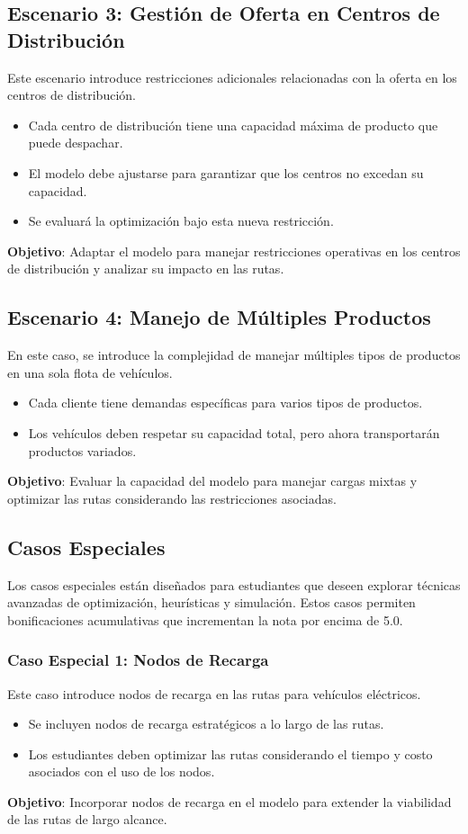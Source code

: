 \documentclass[12pt]{article}
\begin{document}
\subsection{Escenario 3: Gestión de Oferta en Centros de Distribución}
Este escenario introduce restricciones adicionales relacionadas con la oferta en los centros de distribución.
\begin{itemize}
    \item Cada centro de distribución tiene una capacidad máxima de producto que puede despachar.
    \item El modelo debe ajustarse para garantizar que los centros no excedan su capacidad.
    \item Se evaluará la optimización bajo esta nueva restricción.
\end{itemize}
\textbf{Objetivo}: Adaptar el modelo para manejar restricciones operativas en los centros de distribución y analizar su impacto en las rutas.

\subsection{Escenario 4: Manejo de Múltiples Productos}
En este caso, se introduce la complejidad de manejar múltiples tipos de productos en una sola flota de vehículos.
\begin{itemize}
    \item Cada cliente tiene demandas específicas para varios tipos de productos.
    \item Los vehículos deben respetar su capacidad total, pero ahora transportarán productos variados.
\end{itemize}
\textbf{Objetivo}: Evaluar la capacidad del modelo para manejar cargas mixtas y optimizar las rutas considerando las restricciones asociadas.

\subsection{Casos Especiales}
Los casos especiales están diseñados para estudiantes que deseen explorar técnicas avanzadas de optimización, heurísticas y simulación. Estos casos permiten bonificaciones acumulativas que incrementan la nota por encima de 5.0.

\subsubsection{Caso Especial 1: Nodos de Recarga}
Este caso introduce nodos de recarga en las rutas para vehículos eléctricos.
\begin{itemize}
    \item Se incluyen nodos de recarga estratégicos a lo largo de las rutas.
    \item Los estudiantes deben optimizar las rutas considerando el tiempo y costo asociados con el uso de los nodos.
\end{itemize}
\textbf{Objetivo}: Incorporar nodos de recarga en el modelo para extender la viabilidad de las rutas de largo alcance.
\end{document}
